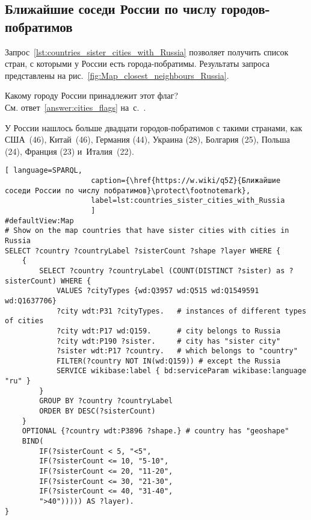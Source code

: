 \newpage
\subsection{Ближайшие соседи России по числу городов-побратимов}

Запрос~\ref{lst:countries_sister_cities_with_Russia} позволяет получить список стран, 
с которыми у России есть города-побратимы. 
Результаты запроса представлены на рис.~\ref{fig:Map_closest_neighbours_Russia}.
%
\begin{marginfigure}[0.0cm]
{
\setlength{\fboxsep}{0pt}%
\setlength{\fboxrule}{1pt}%
%
}
  \caption{Какому городу России принадлежит этот флаг?\\См. ответ~\ref{answer:cities_flags} на~с.~\pageref{answer:cities_flags}.}
  \label{fig:flag_question_city}%
\end{marginfigure}

У России нашлось больше двадцати городов-побратимов с такими странами, 
как США~(46), Китай~(46), Германия (44), Украина (28), Болгария (25), 
Польша (24), Франция (23) и~Италия~(22).


\begin{lstlisting}[ language=SPARQL, 
                    caption={\href{https://w.wiki/q5Z}{Ближайшие соседи России по числу побратимов}\protect\footnotemark},
                    label=lst:countries_sister_cities_with_Russia
                    ]
#defaultView:Map
# Show on the map countries that have sister cities with cities in Russia
SELECT ?country ?countryLabel ?sisterCount ?shape ?layer WHERE {
    { 
		SELECT ?country ?countryLabel (COUNT(DISTINCT ?sister) as ?sisterCount) WHERE {  
			VALUES ?cityTypes {wd:Q3957 wd:Q515 wd:Q1549591 wd:Q1637706}
			?city wdt:P31 ?cityTypes.   # instances of different types of cities
			?city wdt:P17 wd:Q159.      # city belongs to Russia
			?city wdt:P190 ?sister.     # city has "sister city"
			?sister wdt:P17 ?country.   # which belongs to "country"
			FILTER(?country NOT IN(wd:Q159)) # except the Russia
			SERVICE wikibase:label { bd:serviceParam wikibase:language "ru" }
        }
		GROUP BY ?country ?countryLabel
		ORDER BY DESC(?sisterCount)
    }
	OPTIONAL {?country wdt:P3896 ?shape.} # country has "geoshape"
	BIND(
		IF(?sisterCount < 5, "<5",
		IF(?sisterCount <= 10, "5-10",
		IF(?sisterCount <= 20, "11-20",
		IF(?sisterCount <= 30, "21-30",
		IF(?sisterCount <= 40, "31-40",
		">40"))))) AS ?layer).
}
\end{lstlisting}

